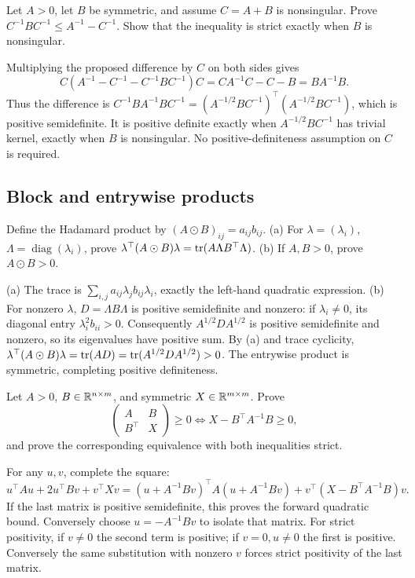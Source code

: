 \begin{problem}\label{ex:12:ineq-ma-31}
Let \(A>0\), let \(B\) be symmetric, and assume \(C=A+B\) is nonsingular.
Prove
\(C^{-1}BC^{-1}\leqslant A^{-1}-C^{-1}\).
Show that the inequality is strict exactly when \(B\) is nonsingular.
\end{problem}
\begin{solution}
Multiplying the proposed difference by \(C\) on both sides gives
\[
C(A^{-1}-C^{-1}-C^{-1}BC^{-1})C
=CA^{-1}C-C-B=BA^{-1}B.
\]
Thus the difference is
\(C^{-1}BA^{-1}BC^{-1}=(A^{-1/2}BC^{-1})^\top(A^{-1/2}BC^{-1})\),
which is positive semidefinite. It is positive definite exactly when
\(A^{-1/2}BC^{-1}\) has trivial kernel, exactly when \(B\) is nonsingular.
No positive-definiteness assumption on \(C\) is required.
\end{solution}

\subsection*{Block and entrywise products}

\begin{problem}\label{ex:12:ineq-ma-32}
Define the Hadamard product by \((A\odot B)_{ij}=a_{ij}b_{ij}\).
(a) For \(\lambda=(\lambda_i)\), \(\Lambda=\operatorname{diag}(\lambda_i)\),
prove \(\lambda^\top(A\odot B)\lambda=\operatorname{tr}(A\Lambda B^\top\Lambda)\).
(b) If \(A,B>0\), prove \(A\odot B>0\).
\end{problem}
\begin{solution}
(a) The trace is \(\sum_{i,j}a_{ij}\lambda_j b_{ij}\lambda_i\),
exactly the left-hand quadratic expression.
(b) For nonzero \(\lambda\), \(D=\Lambda B\Lambda\) is positive
semidefinite and nonzero: if \(\lambda_i\ne0\), its diagonal entry
\(\lambda_i^2b_{ii}>0\). Consequently \(A^{1/2}DA^{1/2}\) is positive
semidefinite and nonzero, so its eigenvalues have positive sum.
By (a) and trace cyclicity,
\(\lambda^\top(A\odot B)\lambda=\operatorname{tr}(AD)
=\operatorname{tr}(A^{1/2}DA^{1/2})>0\).
The entrywise product is symmetric, completing positive definiteness.
\end{solution}

\begin{problem}\label{ex:12:ineq-ma-33}
Let \(A>0\), \(B\in\mathbb R^{n\times m}\), and symmetric \(X\in\mathbb R^{m\times m}\).
Prove
\[
\begin{pmatrix}A&B\\B^\top&X\end{pmatrix}\geqslant0
\iff X-B^\top A^{-1}B\geqslant0,
\]
and prove the corresponding equivalence with both inequalities strict.
\end{problem}
\begin{solution}
For any \(u,v\), complete the square:
\[
u^\top Au+2u^\top Bv+v^\top Xv
=(u+A^{-1}Bv)^\top A(u+A^{-1}Bv)
+v^\top(X-B^\top A^{-1}B)v.
\]
If the last matrix is positive semidefinite, this proves the forward
quadratic bound. Conversely choose \(u=-A^{-1}Bv\) to isolate that matrix.
For strict positivity, if \(v\ne0\) the second term is positive;
if \(v=0,u\ne0\) the first is positive. Conversely the same substitution
with nonzero \(v\) forces strict positivity of the last matrix.
\end{solution}

